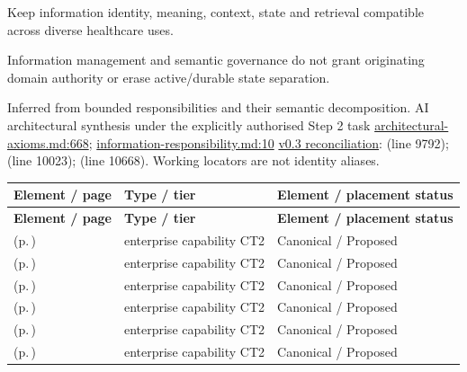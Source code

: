 
Keep information identity, meaning, context, state and retrieval compatible across diverse healthcare uses.



Information management and semantic governance do not grant originating domain authority or erase active/\allowbreak{}durable state separation.


Inferred from bounded responsibilities and their semantic decomposition. AI architectural synthesis under the explicitly authorised Step 2 task \hyperref[evidence:27549d51551beae6]{architectural-axioms.md:668}; \hyperref[evidence:be61392fefb4bb10]{information-responsibility.md:10}
\hyperref[model:reconciliation]{v0.3 reconciliation}: \texttt{} (line 9792); \texttt{} (line 10023); \texttt{} (line 10668). Working locators are not identity aliases.
\begingroup\small\setlength{\TableWidth}{\dimexpr\linewidth-6\tabcolsep-4\arrayrulewidth\relax}
\begin{longtable}{|>{\raggedright\arraybackslash}p{0.52\TableWidth}|>{\raggedright\arraybackslash}p{0.2\TableWidth}|>{\raggedright\arraybackslash}p{0.28\TableWidth}|}
\hline\rowcolor{TableHead}\textbf{Element / page} & \textbf{Type / tier} & \textbf{Element / placement status}\\\hline\endfirsthead
\hline\rowcolor{TableHead}\textbf{Element / page} & \textbf{Type / tier} & \textbf{Element / placement status}\\\hline\endhead
\hline\endfoot
\nameref{cap:ec-01} (p.\,\pageref{cap:ec-01}) & enterprise capability CT2 & Canonical / Proposed\\\hline
\nameref{cap:ec-02} (p.\,\pageref{cap:ec-02}) & enterprise capability CT2 & Canonical / Proposed\\\hline
\nameref{cap:ec-03} (p.\,\pageref{cap:ec-03}) & enterprise capability CT2 & Canonical / Proposed\\\hline
\nameref{cap:ec-04} (p.\,\pageref{cap:ec-04}) & enterprise capability CT2 & Canonical / Proposed\\\hline
\nameref{cap:ec-05} (p.\,\pageref{cap:ec-05}) & enterprise capability CT2 & Canonical / Proposed\\\hline
\nameref{cap:ec-13} (p.\,\pageref{cap:ec-13}) & enterprise capability CT2 & Canonical / Proposed\\\hline
\end{longtable}\endgroup

